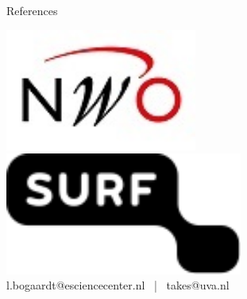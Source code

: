 \documentclass[final]{beamer}
\newlength{\sepwid}
\newlength{\onecolwid}
\begin{document}
\begin{frame}[t]
\begin{columns}[t]
\begin{column}{\onecolwid}
\begin{alertblock}{References}
\nocite{*} %
{\fontsize{20}{20}\selectfont


}

\end{alertblock}

\centering \includegraphics[height=40mm]{NWO.jpg} \hspace{24mm} \includegraphics[height=40mm]{Surf.png}
\\[2mm]
l.bogaardt@esciencecenter.nl \, | \, takes@uva.nl

\end{column} %

\begin{column}{\sepwid}\end{column} %

\end{columns} %

\end{frame} %
\end{document}
